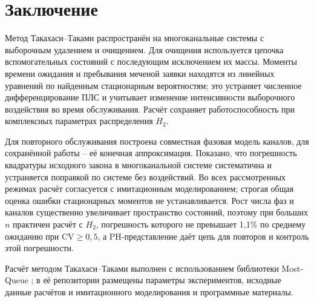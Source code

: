 \section{Заключение}
Метод Такахаси--Таками распространён на многоканальные системы с выборочным удалением и очищением. Для очищения используется цепочка вспомогательных состояний с последующим исключением их массы. Моменты времени ожидания и пребывания меченой заявки находятся из линейных уравнений по найденным стационарным вероятностям; это устраняет численное дифференцирование ПЛС и учитывает изменение интенсивности выборочного воздействия во время обслуживания. Расчёт сохраняет работоспособность при комплексных параметрах распределения \(H_2\).

Для повторного обслуживания построена совместная фазовая модель каналов, для сохранённой работы -- её конечная аппроксимация. Показано, что погрешность квадратуры исходного закона в многоканальной системе систематична и устраняется поправкой по системе без воздействий. Во всех рассмотренных режимах расчёт согласуется с имитационным моделированием; строгая общая оценка ошибки стационарных моментов не устанавливается. Рост числа фаз и каналов существенно увеличивает пространство состояний, поэтому при больших \(n\) практичен расчёт с \(H_2\), погрешность которого не превышает 1,1\% по среднему ожиданию при \(\mathrm{CV}\ge0{,}5\), а PH-представление даёт цепь для повторов и контроль этой погрешности.

Расчёт методом Такахаси--Таками выполнен с использованием библиотеки Most-Queue \cite{mostqueue2026}; в её репозитории размещены параметры экспериментов, исходные данные расчётов и имитационного моделирования и программные материалы.
